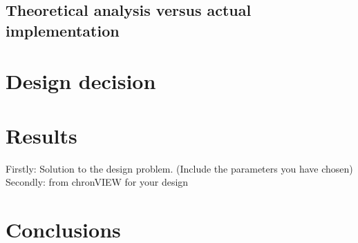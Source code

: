 \subsection{Theoretical analysis versus actual implementation}


\section{Design decision}

\section{Results}

Firstly: Solution to the design problem. (Include the parameters you have chosen)\\
Secondly: from chronVIEW for your design

\section{Conclusions}